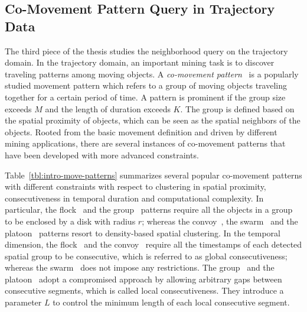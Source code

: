\subsection{Co-Movement Pattern Query in Trajectory Data}
The third piece of the thesis studies the neighborhood
query on the trajectory domain. 
In the trajectory domain, an important
mining task is to discover traveling patterns among moving objects.
A \emph{co-movement pattern}~\cite{li2013managing,zheng2015trajectory} is a popularly studied movement pattern
which refers to a group of moving objects traveling together for a certain 
period of time. A pattern is prominent if the group 
size exceeds $M$ and the length of duration exceeds $K$. 
The group is defined based on the spatial proximity of objects, which 
can be seen as the spatial neighbors of the objects.
Rooted from the basic movement definition and driven by different mining applications,
there are several instances of co-movement patterns that have been developed with more advanced constraints.

Table~\ref{tbl:intro-move-patterns} summarizes several popular co-movement patterns with different 
constraints with respect to clustering in spatial proximity, consecutiveness in temporal duration
and computational complexity. In particular, the flock~\cite{gudmundsson2006computing} and the group~\cite{wang2006grouppattern} patterns require all the objects in a group to be enclosed by a disk with radius $r$;
whereas the convoy~\cite{jeung2008discovery}, the swarm~\cite{li2010swarm} and the platoon~\cite{li2015platoon} patterns resort to density-based spatial clustering. In the temporal dimension,
the flock~\cite{gudmundsson2006computing} and the convoy~\cite{jeung2008discovery} require all the timestamps
of each detected spatial group to be consecutive, which is referred to as global consecutiveness; whereas the swarm~\cite{li2010swarm} does not impose any restrictions. 
The group~\cite{wang2006grouppattern} and the platoon~\cite{li2015platoon} adopt 
a compromised approach by allowing arbitrary gaps between consecutive segments, 
which is called local consecutiveness. They introduce a parameter $L$ to control the minimum length of each local consecutive segment.


